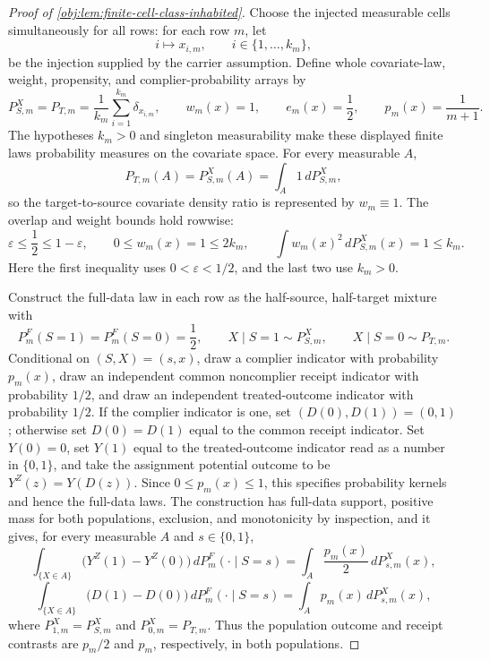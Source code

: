 \begin{proof}[Proof of \cref{obj:lem:finite-cell-class-inhabited}]
Choose the injected measurable cells simultaneously for all rows: for each row
\(m\), let
\[
i\longmapsto x_{i,m},\qquad i\in\{1,\ldots,k_m\},
\]
be the injection supplied by the carrier assumption.  Define whole covariate-law,
weight, propensity, and complier-probability arrays by
\[
P_{S,m}^X=P_{T,m}
=
\frac1{k_m}\sum_{i=1}^{k_m}\delta_{x_{i,m}},
\qquad
w_m(x)=1,
\qquad
e_m(x)=\frac12,
\qquad
p_m(x)=\frac1{m+1}.
\]
The hypotheses \(k_m>0\) and singleton measurability make these displayed
finite laws probability measures on the covariate space.  For every measurable
\(A\),
\[
P_{T,m}(A)=P_{S,m}^X(A)=\int_A 1\,dP_{S,m}^X,
\]
so the target-to-source covariate density ratio is represented by
\(w_m\equiv1\).  The overlap and weight bounds hold rowwise:
\[
\varepsilon\le \frac12\le 1-\varepsilon,
\qquad
0\le w_m(x)=1\le 2k_m,
\qquad
\int w_m(x)^2\,dP_{S,m}^X(x)=1\le k_m .
\]
Here the first inequality uses \(0<\varepsilon<1/2\), and the last two use
\(k_m>0\). %

Construct the full-data law in each row as the half-source, half-target mixture
with
\[
P_m^F(S=1)=P_m^F(S=0)=\frac12,
\qquad
X\mid S=1\sim P_{S,m}^X,
\qquad
X\mid S=0\sim P_{T,m}.
\]
Conditional on \((S,X)=(s,x)\), draw a complier indicator with probability
\(p_m(x)\), draw an independent common noncomplier receipt indicator with
probability \(1/2\), and draw an independent treated-outcome indicator with
probability \(1/2\).  If the complier indicator is one, set
\((D(0),D(1))=(0,1)\); otherwise set \(D(0)=D(1)\) equal to the common receipt
indicator.  Set \(Y(0)=0\), set \(Y(1)\) equal to the treated-outcome indicator
read as a number in \(\{0,1\}\), and take the assignment potential outcome to be
\(Y^Z(z)=Y(D(z))\).  Since \(0\le p_m(x)\le1\), this specifies probability
kernels and hence the full-data laws.  The construction has full-data support,
positive mass for both populations, exclusion, and monotonicity by inspection,
and it gives, for every measurable \(A\) and \(s\in\{0,1\}\),
\[
\int_{\{X\in A\}}\!\bigl(Y^Z(1)-Y^Z(0)\bigr)\,dP_m^F(\cdot\mid S=s)
=
\int_A \frac{p_m(x)}2\,dP_{s,m}^X(x),
\]
\[
\int_{\{X\in A\}}\!\bigl(D(1)-D(0)\bigr)\,dP_m^F(\cdot\mid S=s)
=
\int_A p_m(x)\,dP_{s,m}^X(x),
\]
where \(P_{1,m}^X=P_{S,m}^X\) and \(P_{0,m}^X=P_{T,m}\).  Thus the population
outcome and receipt contrasts are \(p_m/2\) and \(p_m\), respectively, in both
populations. %


\end{proof}
